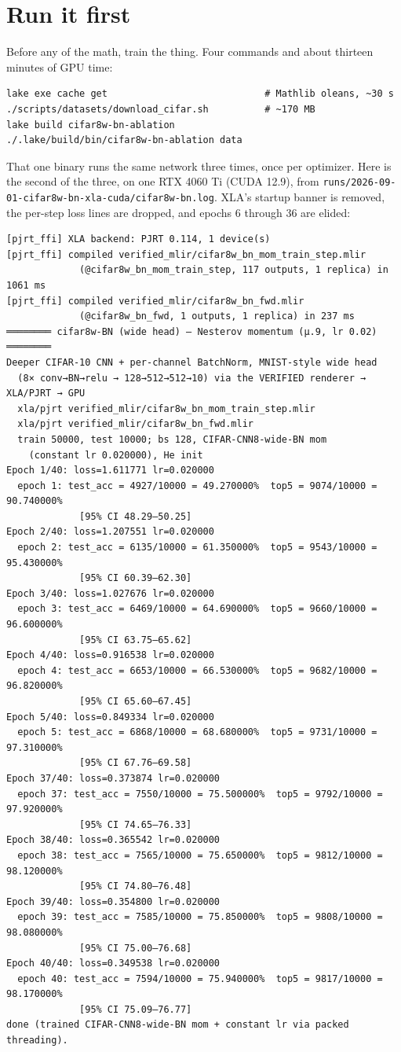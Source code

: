 \section{Run it first}
\label{sec:bn_runit}

Before any of the math, train the thing. Four commands and about
thirteen minutes of GPU time:

\begin{verbatim}
lake exe cache get                            # Mathlib oleans, ~30 s
./scripts/datasets/download_cifar.sh          # ~170 MB
lake build cifar8w-bn-ablation
./.lake/build/bin/cifar8w-bn-ablation data
\end{verbatim}

That one binary runs the same network three times, once per optimizer.
Here is the second of the three, on one RTX 4060 Ti (CUDA 12.9), from
\texttt{runs/2026-09-01-cifar8w-bn-xla-cuda/cifar8w-bn.log}. XLA's
startup banner is removed, the per-step loss lines are dropped, and
epochs 6 through 36 are elided:

\begin{verbatim}
[pjrt_ffi] XLA backend: PJRT 0.114, 1 device(s)
[pjrt_ffi] compiled verified_mlir/cifar8w_bn_mom_train_step.mlir
             (@cifar8w_bn_mom_train_step, 117 outputs, 1 replica) in 1061 ms
[pjrt_ffi] compiled verified_mlir/cifar8w_bn_fwd.mlir
             (@cifar8w_bn_fwd, 1 outputs, 1 replica) in 237 ms
════════ cifar8w-BN (wide head) — Nesterov momentum (μ.9, lr 0.02) ════════
Deeper CIFAR-10 CNN + per-channel BatchNorm, MNIST-style wide head
  (8× conv→BN→relu → 128→512→512→10) via the VERIFIED renderer → XLA/PJRT → GPU
  xla/pjrt verified_mlir/cifar8w_bn_mom_train_step.mlir
  xla/pjrt verified_mlir/cifar8w_bn_fwd.mlir
  train 50000, test 10000; bs 128, CIFAR-CNN8-wide-BN mom
    (constant lr 0.020000), He init
Epoch 1/40: loss=1.611771 lr=0.020000
  epoch 1: test_acc = 4927/10000 = 49.270000%  top5 = 9074/10000 = 90.740000%
             [95% CI 48.29–50.25]
Epoch 2/40: loss=1.207551 lr=0.020000
  epoch 2: test_acc = 6135/10000 = 61.350000%  top5 = 9543/10000 = 95.430000%
             [95% CI 60.39–62.30]
Epoch 3/40: loss=1.027676 lr=0.020000
  epoch 3: test_acc = 6469/10000 = 64.690000%  top5 = 9660/10000 = 96.600000%
             [95% CI 63.75–65.62]
Epoch 4/40: loss=0.916538 lr=0.020000
  epoch 4: test_acc = 6653/10000 = 66.530000%  top5 = 9682/10000 = 96.820000%
             [95% CI 65.60–67.45]
Epoch 5/40: loss=0.849334 lr=0.020000
  epoch 5: test_acc = 6868/10000 = 68.680000%  top5 = 9731/10000 = 97.310000%
             [95% CI 67.76–69.58]
Epoch 37/40: loss=0.373874 lr=0.020000
  epoch 37: test_acc = 7550/10000 = 75.500000%  top5 = 9792/10000 = 97.920000%
             [95% CI 74.65–76.33]
Epoch 38/40: loss=0.365542 lr=0.020000
  epoch 38: test_acc = 7565/10000 = 75.650000%  top5 = 9812/10000 = 98.120000%
             [95% CI 74.80–76.48]
Epoch 39/40: loss=0.354800 lr=0.020000
  epoch 39: test_acc = 7585/10000 = 75.850000%  top5 = 9808/10000 = 98.080000%
             [95% CI 75.00–76.68]
Epoch 40/40: loss=0.349538 lr=0.020000
  epoch 40: test_acc = 7594/10000 = 75.940000%  top5 = 9817/10000 = 98.170000%
             [95% CI 75.09–76.77]
done (trained CIFAR-CNN8-wide-BN mom + constant lr via packed threading).
\end{verbatim}

